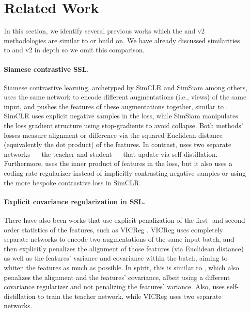 \section{Related Work}
\label{sec:related_work}

In this section, we identify several previous works which the \simdino{} and \simdino{}v2 methodologies are similar to or build on. We have already discussed similarities to \dino{} and \dino{}v2 in depth so we omit this comparison.


\paragraph{Siamese contrastive SSL.} Siamese contrastive learning, archetyped by SimCLR \citep{chen2020simple} and SimSiam \citep{chen2021exploring} among others, uses the same network to encode different augmentations (i.e., views) of the same input, and pushes the features of these augmentations together, similar to \simdino{}. SimCLR uses explicit negative samples in the loss, while SimSiam manipulates the loss gradient structure using stop-gradients to avoid collapse. Both methods' losses measure alignment or difference via the squared Euclidean distance (equivalently the dot product) of the features. In contrast, \simdino{} uses two separate networks --- the teacher and student --- that update via self-distillation. Furthermore, \simdino{} uses the inner product of features in the loss, but it also uses a coding rate regularizer instead of implicitly contrasting negative samples or using the more bespoke contrastive loss in SimCLR.


\paragraph{Explicit covariance regularization in SSL.} There have also been works that use explicit penalization of the first- and second-order statistics of the features, such as VICReg \citep{bardes2021vicreg}. VICReg uses completely separate networks to encode two augmentations of the same input batch, and then explicitly penalizes the alignment of those features (via Euclidean distance) as well as the features' variance and covariance within the batch, aiming to whiten the features as much as possible. In spirit, this is similar to \simdino{}, which also penalizes the alignment and the features' covariance, albeit using a different covariance regularizer and not penalizing the features' variance. Also, \simdino{} uses self-distillation to train the teacher network, while VICReg uses two separate networks.


